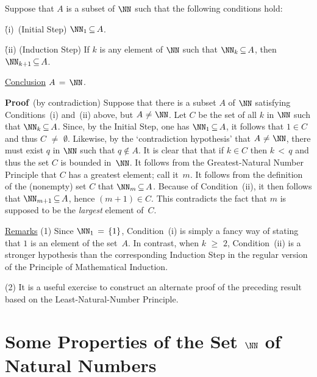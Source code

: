 {        Suppose that $A$ is a subset of ${\NN}$ such that the following conditions hold:

        \h (i)\, (Initial Step) ${\NN}_{1} \,{\subseteq}\, A$.

        \h (ii) (Induction Step) If $k$ is any element of ${\NN}$ such that ${\NN}_{k} \,{\subseteq}\, A$, then ${\NN}_{k+1} \,{\subseteq}\, A$.

        \underline{Conclusion} $A \,=\, {\NN}$.

\V

        {\bf Proof}\, (by contradiction) Suppose that there is a subset $A$ of ${\NN}$ satisfying Conditions~(i) and~(ii) above,
    but $A \,\,{\neq}\,\, {\NN}$. Let $C$ be the set of all $k$ in ${\NN}$ such that ${\NN}_{k} \,{\subseteq}\, A$.
    Since, by the Initial Step, one has ${\NN}_{1} \,{\subseteq}\, A$, it follows that $1{\in}C$ and thus $C \,\,{\neq}\,\, {\emptyset}$.
    Likewise, by the `contradiction hypothesis' that $A \,\,{\neq}\,\, {\NN}$, there must exist $q$ in ${\NN}$ such that $q \not \in A$.
    It is clear that that if $k{\in}C$ then $k\,<\,q$ and thus the set $C$ is bounded in~${\NN}$.
    It follows from the Greatest-Natural Number Principle that $C$ has a greatest element; call it~$m$.
    It follows from the definition of the (nonempty) set $C$ that ${\NN}_{m} \,{\subseteq}\, A$.
    Because of Condition~(ii), it then follows that ${\NN}_{m+1} \,{\subseteq}\, A$, hence $(m+1){\in}C$.
    This contradicts the fact that $m$ is supposed to be the {\em largest} element of~$C$.

\V

        \underline{Remarks} (1) Since ${\NN}_{1} \,=\, \{1\}$, Condition~(i) is simply a fancy way of stating that $1$ is an element of the set~$A$.
    In contrast, when $k\,\,{\geq}\,\,2$, Condition~(ii) is a stronger hypothesis than the corresponding Induction Step in the regular version of the Principle of Mathematical Induction.

\V

        (2) It is a useful exercise to construct an alternate proof of the preceding result based on the Least-Natural-Number Principle.


                                                                                                                                                                         
}%

                        \section{Some Properties of the Set ${\NN}$ of Natural Numbers}
                        \label{SectA11}


